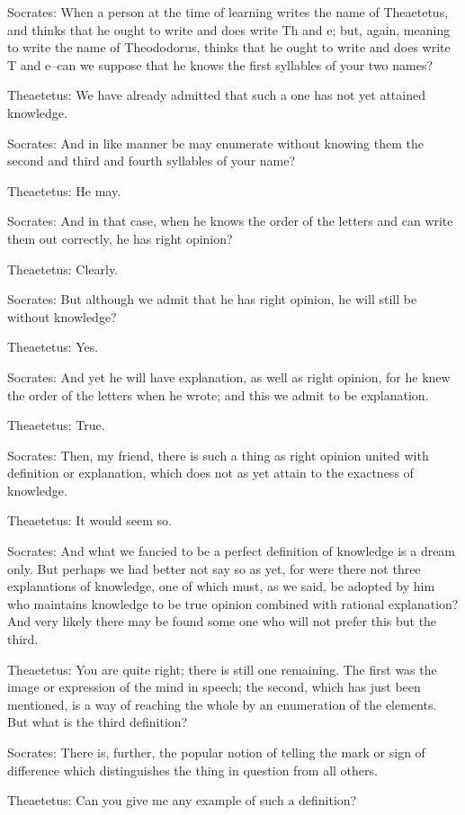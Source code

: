 Socrates: When a person at the time of learning writes the name of
Theaetetus, and thinks that he ought to write and does write Th and e;
but, again, meaning to write the name of Theododorus, thinks that he
ought to write and does write T and e--can we suppose that he knows the
first syllables of your two names?

Theaetetus: We have already admitted that such a one has not yet
attained knowledge.

Socrates: And in like manner be may enumerate without knowing them the
second and third and fourth syllables of your name?

Theaetetus: He may.

Socrates: And in that case, when he knows the order of the letters and
can write them out correctly, he has right opinion?

Theaetetus: Clearly.

Socrates: But although we admit that he has right opinion, he will still
be without knowledge?

Theaetetus: Yes.

Socrates: And yet he will have explanation, as well as right opinion,
for he knew the order of the letters when he wrote; and this we admit to
be explanation.

Theaetetus: True.

Socrates: Then, my friend, there is such a thing as right opinion united
with definition or explanation, which does not as yet attain to the
exactness of knowledge.

Theaetetus: It would seem so.

Socrates: And what we fancied to be a perfect definition of knowledge
is a dream only. But perhaps we had better not say so as yet, for were
there not three explanations of knowledge, one of which must, as we
said, be adopted by him who maintains knowledge to be true opinion
combined with rational explanation? And very likely there may be found
some one who will not prefer this but the third.

Theaetetus: You are quite right; there is still one remaining. The first
was the image or expression of the mind in speech; the second, which has
just been mentioned, is a way of reaching the whole by an enumeration of
the elements. But what is the third definition?

Socrates: There is, further, the popular notion of telling the mark or
sign of difference which distinguishes the thing in question from all
others.

Theaetetus: Can you give me any example of such a definition?

